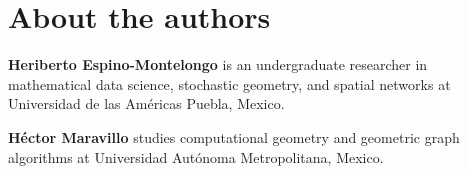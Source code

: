 \documentclass[10pt,letterpaper]{article}
\begin{document}
\section*{About the authors}
\textbf{Heriberto Espino-Montelongo} is an undergraduate researcher in mathematical data science, stochastic geometry, and spatial networks at Universidad de las Am\'ericas Puebla, Mexico.

\textbf{H\'ector Maravillo} studies computational geometry and geometric graph algorithms at Universidad Aut\'onoma Metropolitana, Mexico.
\end{document}
